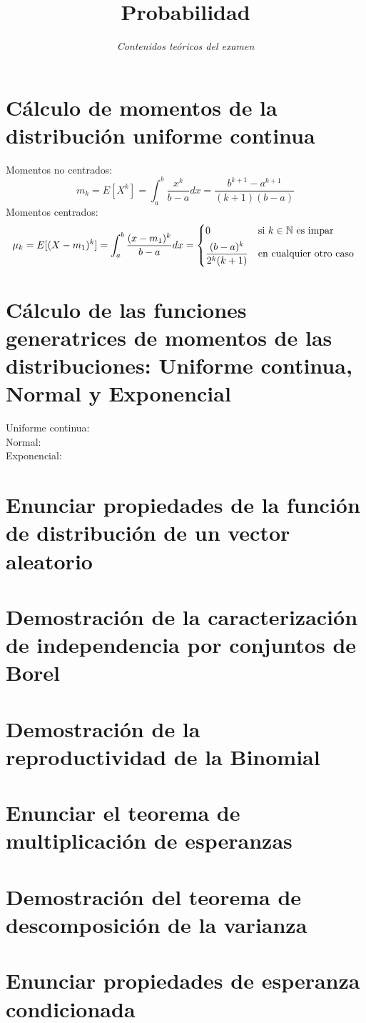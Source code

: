 \documentclass[12pt,a4paper]{article}
\begin{document}
\title{\Huge{\textbf{Probabilidad}}}
\author{\textit{Contenidos teóricos del examen}}
\date{}
\maketitle


\section{Cálculo de momentos de la distribución uniforme continua}
Momentos no centrados:
\[
m_k=E[X^k]=\int_a^b\frac{x^k}{b-a}dx=\frac{b^{k+1}-a^{k+1}}{(k+1)(b-a)}
\]
Momentos centrados:
\[
\mu_k=E[(X-m_1)^k]=\int_a^b\frac{(x-m_1)^k}{b-a}dx=\begin{dcases*}
0 & si $k\in\mathbb{N}$ es impar \\
\frac{(b-a)^k}{2^k(k+1)} & en cualquier otro caso
\end{dcases*}
\]
\section{Cálculo de las funciones generatrices de momentos de las distribuciones: Uniforme continua, Normal y Exponencial}
Uniforme continua:
\[
\]
Normal:
\[
\]
Exponencial:
\[
\]
\section{Enunciar propiedades de la función de distribución de un vector aleatorio}
\section{Demostración de la caracterización de independencia por conjuntos de Borel}
\section{Demostración de la reproductividad de la Binomial}
\section{Enunciar el teorema de multiplicación de esperanzas}
\section{Demostración del teorema de descomposición de la varianza}
\section{Enunciar propiedades de esperanza condicionada}
\end{document}

